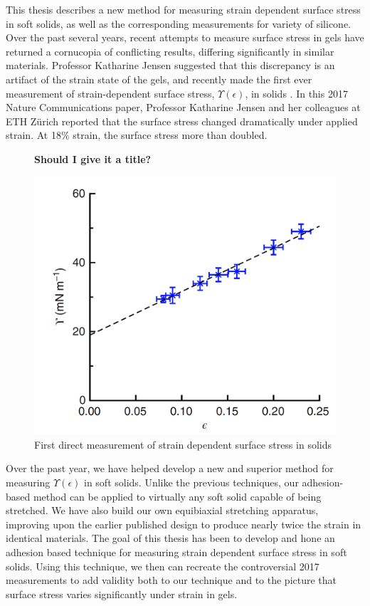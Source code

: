 This thesis describes a new method for measuring strain dependent surface stress in soft solids, as well as the corresponding measurements for variety of silicone. Over the past several years, recent attempts to measure surface stress in gels have returned a cornucopia of conflicting results, differing significantly in similar materials. Professor Katharine Jensen suggested that this discrepancy is an artifact of the strain state of the gels, and recently made the first ever measurement of strain-dependent surface stress, $\Upsilon(\epsilon)$, in solids \cite{xu2017direct}. In this 2017 Nature Communications paper, Professor Katharine Jensen and her colleagues at ETH Zürich reported that the surface stress changed dramatically under applied strain. At 18\% strain, the surface stress more than doubled. 
\begin{figure}[h!]
	\centering
	\textbf{Should I give it a title?}\par\medskip
	\includegraphics[width=0.7\linewidth]{Chapters/Figures/2017natcomfig}
	\caption[Surface Stress vs. Strain in Silicone]{First direct measurement of strain dependent surface stress in solids \cite{xu2017direct}}
	\label{fig:2017natcomfig}
\end{figure}

Over the past year, we have helped develop a new and superior method for measuring $\Upsilon(\epsilon)$ in soft solids. Unlike the previous techniques, our adhesion-based method can be applied to virtually any soft solid capable of being stretched. We have also build our own equibiaxial stretching apparatus, improving upon the earlier published design \cite{xu2017direct} to produce nearly twice the strain in identical materials. The goal of this thesis has been to develop and hone an adhesion based technique for measuring strain dependent surface stress in soft solids. Using this technique, we then can recreate the controversial 2017 measurements to add validity both to our technique and to the picture that surface stress varies significantly under strain in gels.


